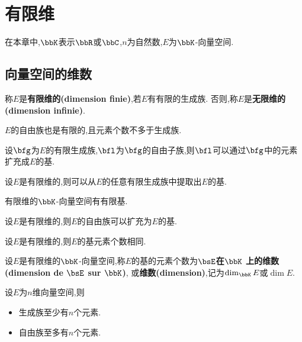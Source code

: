 \chapter{有限维}

在本章中,$\bbK$表示$\bbR$或$\bbC$,$n$为自然数,$E$为$\bbK$-向量空间.

\section{向量空间的维数}

\begin{deff}
    称$E$是\textbf{有限维的(dimension finie)},若$E$有有限的生成族.
    否则,称$E$是\textbf{无限维的(dimension infinie)}.
\end{deff}

\begin{rqq}
    $E$的自由族也是有限的,且元素个数不多于生成族.
\end{rqq}

\begin{prop}
    设$\bfg$为$E$的有限生成族,$\bfl$为$\bfg$的自由子族,则$\bfl$可以通过$\bfg$中的元素扩充成$E$的基.
\end{prop}

\begin{thm}
    设$E$是有限维的,则可以从$E$的任意有限生成族中提取出$E$的基.
\end{thm}

\begin{cor}
    有限维的$\bbK$-向量空间有有限基.
\end{cor}

\begin{thm}
    设$E$是有限维的,则$E$的自由族可以扩充为$E$的基.
\end{thm}

\begin{thm}
    设$E$是有限维的,则$E$的基元素个数相同.
\end{thm}

\begin{deff}
    设$E$是有限维的$\bbK$-向量空间,称$E$的基的元素个数为\textbf{$\bsE$在$\boldsymbol{\bbK}$
    上的维数(dimension de $\bsE$ sur $\boldsymbol{\bbK}$)},
    或\textbf{维数(dimension)},记为$\dim_{\bbK} E$或$\dim E$.
\end{deff}

\begin{prop}
    设$E$为$n$维向量空间,则

    \begin{itemize}
        \item 生成族至少有$n$个元素.
        \item 自由族至多有$n$个元素.
    \end{itemize}
\end{prop}

